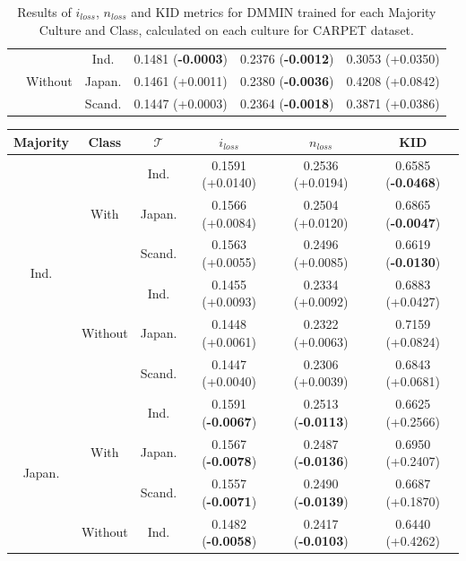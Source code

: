 \begin{table}[]
\begin{tabular}{c|c|c|c|c|c}
\hhline{~-----}
 & \multirow{3}{*}{Without} &Ind.     & 0.1481 (\textbf{-0.0003})       & 0.2376 (\textbf{-0.0012})       & 0.3053 (+0.0350)   \\
 &  & Japan.   & 0.1461 (+0.0011)       & 0.2380 (\textbf{-0.0036})       & 0.4208 (+0.0842)    \\
 &  & Scand. & 0.1447 (+0.0003)       & 0.2364 (\textbf{-0.0018})       & 0.3871 (+0.0386) \\
\bottomrule
    \end{tabular}
    \caption{Results of $i_{loss}$, $n_{loss}$ and KID metrics for DMMIN trained for each Majority Culture and Class, calculated on each culture for CARPET dataset.}
    \label{ch3:tab:ris:dmmin:carpet}
\end{table}
%
%
\begin{table}[]
\centering
\small
\begin{tabular}{c|c|c|c|c|c}
    \textbf{Majority} & \textbf{Class} & \textbf{$\mathcal{T}$} & \textbf{$i_{loss}$} & \textbf{$n_{loss}$} & \textbf{KID} \\
    \toprule
\multirow{6}{*}{Ind.} & \multirow{3}{*}{With} & Ind.     & 0.1591 (+0.0140)       & 0.2536 (+0.0194)       & 0.6585 (\textbf{-0.0468}) \\
 &  & Japan.   & 0.1566 (+0.0084)       & 0.2504 (+0.0120)       & 0.6865 (\textbf{-0.0047})   \\
 &  & Scand. & 0.1563 (+0.0055)       & 0.2496 (+0.0085)       & 0.6619 (\textbf{-0.0130})  \\
\hhline{~-----}
 & \multirow{3}{*}{Without} & Ind.     & 0.1455 (+0.0093)       & 0.2334 (+0.0092)       & 0.6883 (+0.0427) \\
 &  & Japan.   & 0.1448 (+0.0061)       & 0.2322 (+0.0063)       & 0.7159 (+0.0824) \\
 &  & Scand. & 0.1447 (+0.0040)       & 0.2306 (+0.0039)       & 0.6843 (+0.0681)  \\
\midrule
\multirow{6}{*}{Japan.} & \multirow{3}{*}{With} & Ind.     & 0.1591 (\textbf{-0.0067})       & 0.2513 (\textbf{-0.0113})       & 0.6625 (+0.2566)  \\
 &  & Japan.   & 0.1567 (\textbf{-0.0078})       & 0.2487 (\textbf{-0.0136})       & 0.6950 (+0.2407)  \\
 &  & Scand. & 0.1557 (\textbf{-0.0071})       & 0.2490 (\textbf{-0.0139})       & 0.6687 (+0.1870)  \\
\hhline{~-----}
 & \multirow{3}{*}{Without} & Ind.     & 0.1482 (\textbf{-0.0058})       & 0.2417 (\textbf{-0.0103})       & 0.6440 (+0.4262) \\

\end{tabular}
\end{table}
